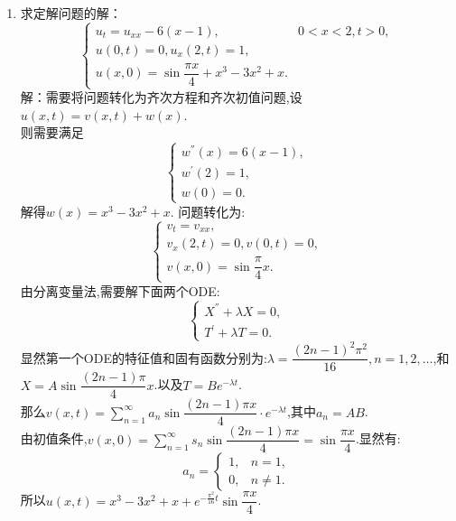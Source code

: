 \documentclass[11pt]{article}
\begin{document}
\begin{enumerate}
        \item 求定解问题的解：
           \[
        \left\{
         \begin{array}{lr}
         u_{t}=u_{xx}-6(x-1),&0<x<2,t>0, \\
         u(0,t)=0, u_x(2,t)=1, \\
         u(x,0)=\sin \dfrac{\pi x}{4}+x^3-3x^2+x.
         \end{array}
        \right. \]
            解：需要将问题转化为齐次方程和齐次初值问题,设$u(x,t)=v(x,t)+w(x)$.\\
        则需要满足\[
        \begin{cases}
            w^{''}(x)=6(x-1),\\
            w^{'}(2)=1,\\
            w(0)=0.
        \end{cases}
        \]
        解得$w(x)=x^3-3x^2+x$.
        问题转化为:\[
        \left\{
         \begin{array}{lr}
         v_{t}=v_{xx}, \\
         v_x(2,t)=0,v(0,t)=0, \\
         v(x,0)=\sin\dfrac{\pi}{4}x.
         \end{array}
        \right. \]
        由分离变量法,需要解下面两个ODE:\[
        \begin{cases}
            X^{''}+\lambda X=0,\\
            T^{'}+\lambda T=0.
        \end{cases}
        \]
        显然第一个ODE的特征值和固有函数分别为:$\lambda=\dfrac{(2n-1)^2\pi^2}{16},n=1,2,\dots$,和$X=A\sin\dfrac{(2n-1)\pi}{4}x$.以及$T=Be^{-\lambda t}$.\\那么$v(x,t)=\sum\limits^{\infty}_{n=1}a_n\sin\dfrac{(2n-1)\pi x}{4}\cdot e^{-\lambda t}$,其中$a_n=AB$.\\由初值条件,$v(x,0)=\sum\limits^{\infty}_{n=1}s_n\sin\dfrac{(2n-1)\pi x}{4}=\sin\dfrac{\pi x}{4}$.显然有:
        \[
                a_n=\begin{cases}
                        1, & n=1, \\
                        0, & n\neq 1.
                \end{cases}
        \]
        所以$u(x,t)=x^3-3x^2+x+e^{-\frac{\pi^2}{16}t}\sin\dfrac{\pi x}{4}$.


\end{enumerate}
\end{document}
